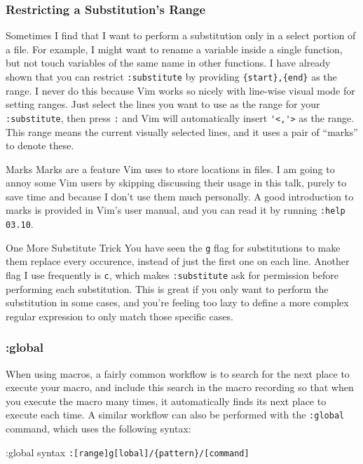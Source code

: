 \documentclass{beamer}
\begin{document}
\begin{frame}[fragile]
    \frametitle{Restricting a Substitution's Range}
    \small
    Sometimes I find that I want to perform a substitution only in a select portion of a file. For example, I might want to rename a variable inside a single function, but not touch variables of the same name in other functions. I have already shown that you can restrict \verb+:substitute+ by providing \verb+{start},{end}+ as the range. I never do this because Vim works so nicely with line-wise visual mode for setting ranges. Just select the lines you want to use as the range for your \verb+:substitute+, then press \verb+:+ and Vim will automatically insert \verb+'<,'>+ as the range. This range means the current visually selected lines, and it uses a pair of \enquote{marks} to denote these.
    \begin{block}{Marks}
	Marks are a feature Vim uses to store locations in files. I am going to annoy some Vim users by skipping discussing their usage in this talk, purely to save time and because I don't use them much personally. A good introduction to marks is provided in Vim's user manual, and you can read it by running \verb+:help 03.10+.
    \end{block}
\end{frame}

\begin{frame}[fragile]
    \small
    \begin{block}{One More Substitute Trick}
	You have seen the \verb+g+ flag for substitutions to make them replace every occurence, instead of just the first one on each line. Another flag I use frequently is \verb+c+, which makes \verb+:substitute+ ask for permission before performing each substitution. This is great if you only want to perform the substitution in some cases, and you're feeling too lazy to define a more complex regular expression to only match those specific cases.
    \end{block}
\end{frame}

\begin{frame}[fragile]
    \frametitle{:global}
    \small
    When using macros, a fairly common workflow is to search for the next place to execute your macro, and include this search in the macro recording so that when you execute the macro many times, it automatically finds its next place to execute each time. A similar workflow can also be performed with the \verb+:global+ command, which uses the following syntax:\\
    \vspace{0.5cm}
    \begin{block}{:global syntax}
	\verb+:[range]g[lobal]/{pattern}/[command]+
    \end{block}
\end{frame}
\end{document}
